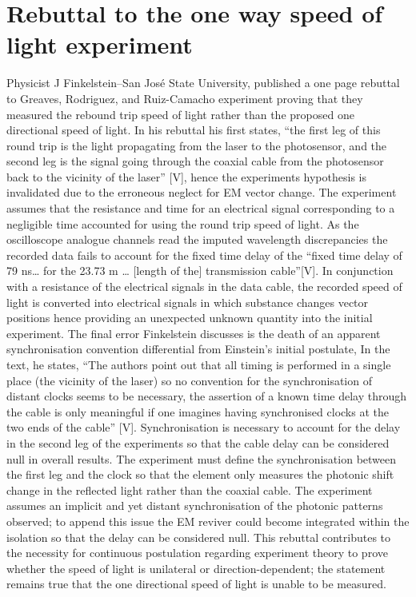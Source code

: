 \documentclass[12pt,letterpaper]{article}
\begin{document}
\section{Rebuttal to the one way speed of light experiment}
Physicist J Finkelstein–San José State University, published a one page rebuttal to Greaves, Rodriguez, and Ruiz-Camacho experiment proving that they measured the rebound trip speed of light rather than the proposed one directional speed of light. In his rebuttal his first states, “the first leg of this round trip is the light propagating from the laser to the photosensor, and the second leg is the signal going through the coaxial cable from the photosensor back to the vicinity of the laser” [V], hence the experiments hypothesis is invalidated due to the erroneous neglect for EM vector change. The experiment assumes that the resistance and time for an electrical signal corresponding to a negligible time accounted for using the round trip speed of light.  As the oscilloscope analogue channels read the imputed wavelength discrepancies the recorded data fails to account for the fixed time delay of the “fixed time delay of 79 ns… for the 23.73 m … [length of the] transmission cable”[V]. In conjunction with a resistance of the electrical signals in the data cable, the recorded speed of light is converted into electrical signals in which substance changes vector positions hence providing an unexpected unknown quantity into the initial experiment. The final error Finkelstein discusses is the death of an apparent synchronisation convention differential from Einstein's initial postulate, In the text, he states, “The authors point out that all timing is performed in a single place (the vicinity of the laser) so no convention for the synchronisation of distant clocks seems to be necessary, the assertion of a known time delay through the cable is only meaningful if one imagines having synchronised clocks at the two ends of the cable” [V]. Synchronisation is necessary to account for the delay in the second leg of the experiments so that the cable delay can be considered null in overall results. The experiment must define the synchronisation between the first leg and the clock so that the element only measures the photonic shift change in the reflected light rather than the coaxial cable. The experiment assumes an implicit and yet distant synchronisation of the photonic patterns observed; to append this issue the EM reviver could become integrated within the isolation so that the delay can be considered null. This rebuttal contributes to the necessity for continuous postulation regarding experiment theory to prove whether the speed of light is unilateral or direction-dependent; the statement remains true that the one directional speed of light is unable to be measured. 
\end{document}
